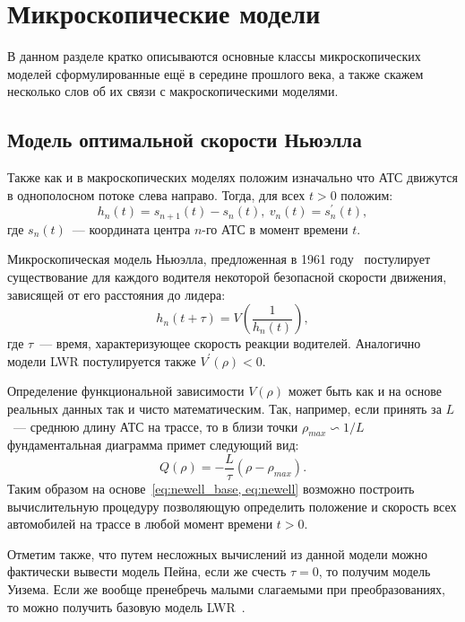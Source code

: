 \section{Микроскопические модели}\label{subsec:ch1/sec2}
В данном разделе кратко описываются основные классы микроскопических моделей сформулированные ещё в середине прошлого века, а также скажем несколько слов об их связи с макроскопическими моделями.

\subsection{Модель оптимальной скорости Ньюэлла}\label{subsec:ch1/sec2/sub1}
Также как и в макроскопических моделях положим изначально что АТС движутся в однополосном потоке слева направо.
Тогда, для всех \(t>0\) положим:
\begin{equation}
    \label{eq:newell_base}
    h_n(t) = s_{n+1}(t) - s_n(t),\ v_n(t)=s_n^{'}(t),
\end{equation}
где \(s_n(t)\)~--- координата центра \(n\)-го АТС в момент времени \(t\).

Микроскопическая модель Ньюэлла, предложенная в 1961 году~\cite{newell1961nonlinear} постулирует существование для каждого водителя некоторой безопасной скорости движения, зависящей от его расстояния до лидера:
\begin{equation}\label{eq:newell}
  h_n(t+\tau) = V\left(\frac{1}{h_n(t)}\right),
\end{equation}
где \(\tau\)~--- время, характеризующее скорость реакции водителей.
Аналогично модели LWR постулируется также \(V^{'}(\rho) < 0\).

Определение функциональной зависимости \(V(\rho)\) может быть как и на основе реальных данных так и чисто математическим.
Так, например, если принять за \(L\)~--- среднюю длину АТС на трассе, то в близи точки \(\rho_{max} \backsim 1/L \) фундаментальная диаграмма примет следующий вид:
\[
    Q(\rho) = -\frac{L}{\tau}(\rho - \rho_{max}).
\]
Таким образом на основе~\ref{eq:newell_base, eq:newell} возможно построить вычислительную процедуру позволяющую определить положение и скорость всех автомобилей на трассе в любой момент времени \(t>0\).

Отметим также, что путем несложных вычислений из данной модели можно фактически вывести модель Пейна, если же счесть \(\tau=0\), то получим модель Уизема.
Если же вообще пренебречь малыми слагаемыми при преобразованиях, то можно получить базовую модель LWR~\cite{gasn2017introd}.

